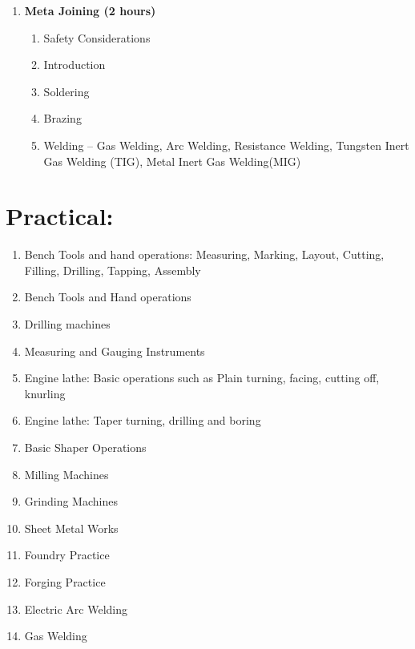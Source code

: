 \begin{enumerate}
    \item \textbf{Meta Joining \hfill (2 hours)}
    \begin{enumerate}
        \item Safety Considerations
        \item Introduction
        \item Soldering
        \item Brazing
        \item Welding -- Gas Welding, Arc Welding, Resistance Welding, Tungsten Inert Gas Welding (TIG), Metal Inert Gas Welding(MIG)
    \end{enumerate}
\end{enumerate}

\section*{Practical:}
\begin{enumerate}
    \item Bench Tools and hand operations: Measuring, Marking, Layout, Cutting, Filling, Drilling, Tapping, Assembly
    \item Bench Tools and Hand operations
    \item Drilling machines
    \item Measuring and Gauging Instruments
    \item Engine lathe: Basic operations such as Plain turning, facing, cutting off, knurling
    \item Engine lathe: Taper turning, drilling and boring
    \item Basic Shaper Operations
    \item Milling Machines
    \item Grinding Machines
    \item Sheet Metal Works
    \item Foundry Practice
    \item Forging Practice
    \item Electric Arc Welding
    \item Gas Welding
\end{enumerate}

